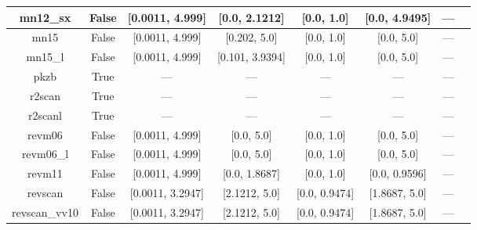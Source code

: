 \begin{tabular}{|c|c|c|c|c|c|c|l|}
     mn12\_sx &                 False &  [0.0011, 4.999] &    [0.0, 2.1212] &    [0.0, 1.0] &  [0.0, 4.9495] &        --- &                                                          \cite{Peverati2012_16187} \\ \hline
         mn15 &                 False &  [0.0011, 4.999] &     [0.202, 5.0] &    [0.0, 1.0] &     [0.0, 5.0] &        --- &                                                                 \cite{Yu2016_5032} \\ \hline
      mn15\_l &                 False &  [0.0011, 4.999] &  [0.101, 3.9394] &    [0.0, 1.0] &     [0.0, 5.0] &        --- &                                                                 \cite{Yu2016_1280} \\ \hline
         pkzb &                  True &              --- &              --- &           --- &            --- &        --- &                                                             \cite{Perdew1999_2544} \\ \hline
       r2scan &                  True &              --- &              --- &           --- &            --- &        --- &                                           \cite{Furness2020_8208,Furness2020_9248} \\ \hline
      r2scanl &                  True &              --- &              --- &           --- &            --- &        --- &                          \cite{Mejia2020_121109,Furness2020_8208,Furness2020_9248} \\ \hline
       revm06 &                 False &  [0.0011, 4.999] &       [0.0, 5.0] &    [0.0, 1.0] &     [0.0, 5.0] &        --- &                                                              \cite{Wang2018_10257} \\ \hline
    revm06\_l &                 False &  [0.0011, 4.999] &       [0.0, 5.0] &    [0.0, 1.0] &     [0.0, 5.0] &        --- &                                                               \cite{Wang2017_8487} \\ \hline
       revm11 &                 False &  [0.0011, 4.999] &    [0.0, 1.8687] &    [0.0, 1.0] &  [0.0, 0.9596] &        --- &                                                              \cite{Verma2019_2966} \\ \hline
      revscan &                 False & [0.0011, 3.2947] &    [2.1212, 5.0] & [0.0, 0.9474] &  [1.8687, 5.0] &        --- &                                                              \cite{Mezei2018_2469} \\ \hline
revscan\_vv10 &                 False & [0.0011, 3.2947] &    [2.1212, 5.0] & [0.0, 0.9474] &  [1.8687, 5.0] &        --- &                                                              \cite{Mezei2018_2469} \\ \hline

\end{tabular}
